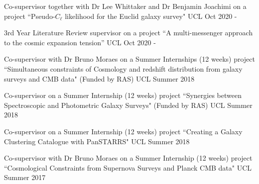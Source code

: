 \begin{cvhonors}

  
    {Co-supervisor together with Dr Lee Whittaker and Dr Benjamin Joachimi on a project ``Pseudo-$C_{\ell}$ likelihood for the Euclid galaxy survey"} %
    {UCL} %
    {Oct 2020 - } %

    {3rd Year Literature Review supervisor on a project ``A multi-messenger approach to the cosmic expansion tension''} %
    {UCL} %
    {Oct 2020 - } %

    {Co-supervisor with Dr Bruno Moraes on a Summer Internships (12 weeks) project ``Simultaneous constraints of Cosmology and redshift distribution from galaxy surveys and CMB data" (Funded by RAS)} %
    {UCL} %
    {Summer 2018} 

    {Co-supervisor on a Summer Internship (12 weeks) project ``Synergies between Spectroscopic and Photometric Galaxy Surveys" (Funded by RAS)} %
    {UCL} %
    {Summer 2018} 

    {Co-supervisor on a Summer Internship (12 weeks) project ``Creating a Galaxy Clustering Catalogue with PanSTARRS"} %
    {UCL} %
    {Summer 2018}
    
    {Co-supervisor with Dr Bruno Moraes on a Summer Internship (12 weeks) project ``Cosmological Constraints from Supernova Surveys and Planck CMB data"} %
    {UCL} %
    {Summer 2017} 

\end{cvhonors}